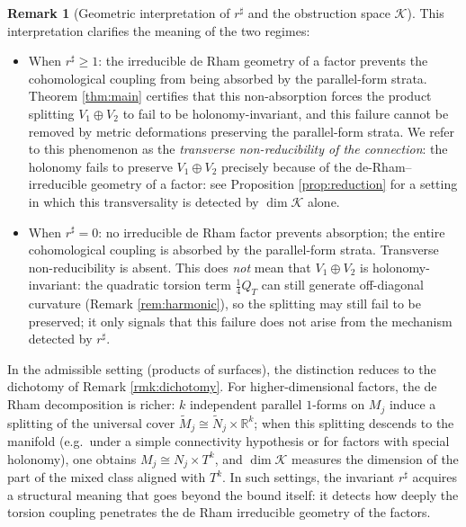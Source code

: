 \documentclass[11pt,reqno]{amsart}
\theoremstyle{plain}
\theoremstyle{definition}
\newtheorem{remark}[theorem]{Remark}
\numberwithin{equation}{section}
\begin{document}
\begin{remark}[Geometric interpretation of $r^\sharp$ and the obstruction space $\mathcal{K}$]
This interpretation clarifies the meaning of the two regimes:
\begin{itemize}
\item[(i)] When $r^{\sharp}\geq 1$: the irreducible de Rham geometry of a factor prevents the cohomological coupling from being absorbed by the parallel-form strata. Theorem \ref{thm:main} certifies that this non-absorption forces the product splitting $V_1\oplus V_2$ to fail to be holonomy-invariant, and this failure cannot be removed by metric deformations preserving the parallel-form strata. We refer to this phenomenon as the \emph{transverse non-reducibility of the connection}: the holonomy fails to preserve $V_1\oplus V_2$ precisely because of the de-Rham--irreducible geometry of a factor: see Proposition \ref{prop:reduction} for a setting in which this transversality is detected by $\dim\mathcal{K}$ alone.
\item[(ii)] When $r^{\sharp}=0$: no irreducible de Rham factor prevents absorption; the entire cohomological coupling is absorbed by the parallel-form strata. Transverse non-reducibility is absent. This does \emph{not} mean that $V_1\oplus V_2$ is holonomy-invariant: the quadratic torsion term $\frac{1}{4}Q_T$ can still generate off-diagonal curvature (Remark \ref{rem:harmonic}), so the splitting may still fail to be preserved; it only signals that this failure does not arise from the mechanism detected by $r^\sharp$.
\end{itemize}

In the admissible setting (products of surfaces), the distinction reduces to the dichotomy of Remark \ref{rmk:dichotomy}.
For higher-dimensional factors, the de Rham decomposition is richer: $k$ independent parallel $1$-forms on $M_j$ induce a splitting of the universal cover $\widetilde{M}_j\cong\widetilde{N}_j\times\mathbb{R}^k$;
when this splitting descends to the manifold (e.g.\ under a simple connectivity hypothesis or for factors with special holonomy), one obtains $M_j\cong N_j\times T^k$, and $\dim\mathcal{K}$ measures the dimension of the part of the mixed class aligned with $T^k$.
In such settings, the invariant $r^{\sharp}$ acquires a structural meaning that goes beyond the bound itself: it detects how deeply the torsion coupling penetrates the de Rham irreducible geometry of the factors.
\end{remark}
\end{document}
